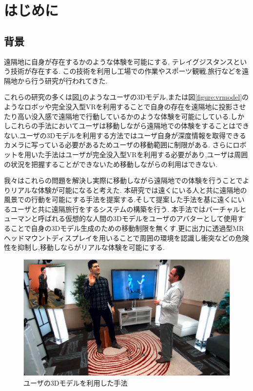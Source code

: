 \section{はじめに}
\subsection{背景}
遠隔地に自身が存在するかのような体験を可能にする, テレイグジスタンスという技術が存在する\cite{telexistence}.
この技術を利用し工場での作業やスポーツ観戦,旅行などを遠隔地から行う研究が行われてきた\cite{factorio}\cite{sprots}\cite{oculus}.

これらの研究の多くは図\ref{figure:Holopotation}のようなユーザの3Dモデル,または図\ref{figure:vrmodel}のようなロボッや完全没入型VRを利用することで自身の存在を遠隔地に投影させたり高い没入感で遠隔地で行動しているかのような体験を可能にしている\cite{vrmodel}\cite{ogasawara}.しかしこれらの手法においてユーザは移動しながら遠隔地での体験をすることはできない.ユーザの3Dモデルを利用する方法ではユーザ自身が深度情報を取得できるカメラに写っている必要があるためユーザの移動範囲に制限がある.
さらにロボットを用いた手法はユーザが完全没入型VRを利用する必要があり,ユーザは周囲の状況を把握することができないため移動しながらの利用はできない.

我々はこれらの問題を解決し実際に移動しながら遠隔地での体験を行うことでよりリアルな体験が可能になると考えた.
本研究では遠くにいる人と共に遠隔地の風景での行動を可能にする手法を提案する.そして提案した手法を基に遠くにいるユーザと共に遠隔旅行をするシステムの構築を行う.
本手法ではバーチャルヒューマンと呼ばれる仮想的な人間の3Dモデルをユーザのアバターとして使用することで自身の3Dモデル生成のための移動制限を無くす.更に出力に透過型MRヘッドマウントディスプレイを用いることで周囲の環境を認識し衝突などの危険性を抑制し,移動しならがリアルな体験を可能にする.

\begin{figure}[htbp]
\begin{center}
\includegraphics[width=16cm]{img/01_background/usermodel.eps} 
\end{center}
\caption{ユーザの3Dモデルを利用した手法}
\label{figure:Holopotation}
\end{figure} 

